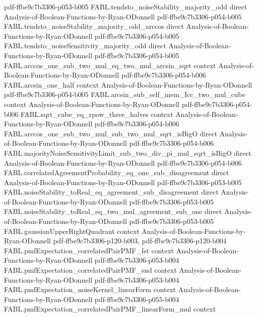 \begin{theorem}
  {pdf-ffbe9c7b3306-p053-b005}
\proofstep
  {FABL.tendsto_noiseStability_majority_odd}
  {direct}
  {Analysis-of-Boolean-Functions-by-Ryan-ODonnell}
  {pdf-ffbe9c7b3306-p054-b005}
\proofstep
  {FABL.tendsto_noiseStability_majority_odd_arccos}
  {direct}
  {Analysis-of-Boolean-Functions-by-Ryan-ODonnell}
  {pdf-ffbe9c7b3306-p054-b005}
\proofstep
  {FABL.tendsto_noiseSensitivity_majority_odd}
  {direct}
  {Analysis-of-Boolean-Functions-by-Ryan-ODonnell}
  {pdf-ffbe9c7b3306-p054-b005}
\proofstep
  {FABL.arccos_one_sub_two_mul_eq_two_mul_arcsin_sqrt}
  {context}
  {Analysis-of-Boolean-Functions-by-Ryan-ODonnell}
  {pdf-ffbe9c7b3306-p054-b006}
\proofstep
  {FABL.arcsin_one_half}
  {context}
  {Analysis-of-Boolean-Functions-by-Ryan-ODonnell}
  {pdf-ffbe9c7b3306-p054-b005}
\proofstep
  {FABL.arcsin_sub_self_mem_Icc_two_mul_cube}
  {context}
  {Analysis-of-Boolean-Functions-by-Ryan-ODonnell}
  {pdf-ffbe9c7b3306-p054-b006}
\proofstep
  {FABL.sqrt_cube_eq_rpow_three_halves}
  {context}
  {Analysis-of-Boolean-Functions-by-Ryan-ODonnell}
  {pdf-ffbe9c7b3306-p054-b006}
\proofstep
  {FABL.arccos_one_sub_two_mul_sub_two_mul_sqrt_isBigO}
  {direct}
  {Analysis-of-Boolean-Functions-by-Ryan-ODonnell}
  {pdf-ffbe9c7b3306-p054-b006}
\proofstep
  {FABL.majorityNoiseSensitivityLimit_sub_two_div_pi_mul_sqrt_isBigO}
  {direct}
  {Analysis-of-Boolean-Functions-by-Ryan-ODonnell}
  {pdf-ffbe9c7b3306-p054-b006}
\proofstep
  {FABL.correlatedAgreementProbability_eq_one_sub_disagreement}
  {direct}
  {Analysis-of-Boolean-Functions-by-Ryan-ODonnell}
  {pdf-ffbe9c7b3306-p053-b005}
\proofstep
  {FABL.noiseStability_toReal_eq_agreement_sub_disagreement}
  {direct}
  {Analysis-of-Boolean-Functions-by-Ryan-ODonnell}
  {pdf-ffbe9c7b3306-p053-b005}
\proofstep
  {FABL.noiseStability_toReal_eq_two_mul_agreement_sub_one}
  {direct}
  {Analysis-of-Boolean-Functions-by-Ryan-ODonnell}
  {pdf-ffbe9c7b3306-p053-b005}
\proofstep
  {FABL.gaussianUpperRightQuadrant}
  {context}
  {Analysis-of-Boolean-Functions-by-Ryan-ODonnell}
  {pdf-ffbe9c7b3306-p120-b003,
    pdf-ffbe9c7b3306-p120-b004}
\proofstep
  {FABL.pmfExpectation_correlatedPairPMF_fst}
  {context}
  {Analysis-of-Boolean-Functions-by-Ryan-ODonnell}
  {pdf-ffbe9c7b3306-p053-b004}
\proofstep
  {FABL.pmfExpectation_correlatedPairPMF_snd}
  {context}
  {Analysis-of-Boolean-Functions-by-Ryan-ODonnell}
  {pdf-ffbe9c7b3306-p053-b004}
\proofstep
  {FABL.pmfExpectation_noiseKernel_linearForm}
  {context}
  {Analysis-of-Boolean-Functions-by-Ryan-ODonnell}
  {pdf-ffbe9c7b3306-p055-b004}
\proofstep
  {FABL.pmfExpectation_correlatedPairPMF_linearForm_mul}
  {context}

\end{theorem}
